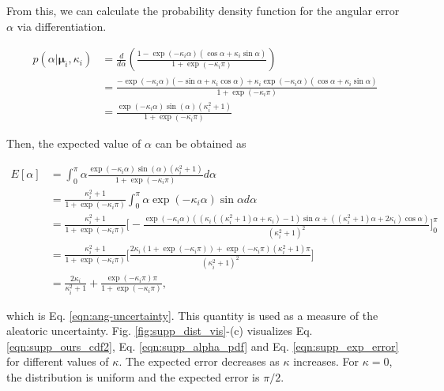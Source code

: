 \documentclass[10pt,twocolumn,letterpaper]{article}
\begin{document}
\noindent
From this, we can calculate the probability density function for the angular error $\alpha$ via differentiation.

\begin{equation}
\begin{aligned}
\label{eqn:supp_alpha_pdf}
p(\alpha|\boldsymbol{\mu}_i,\kappa_i)
&= \frac{d}{d\alpha}
\left(
\frac{1 - \exp(-\kappa_i \alpha) (\cos \alpha + \kappa_i \sin \alpha)}{1 + \exp(-\kappa_i \pi)}
\right) \\
&= 
\frac{- \exp(-\kappa_i \alpha) (-\sin \alpha + \kappa_i \cos \alpha)
+ \kappa_i \exp(-\kappa_i \alpha) (\cos \alpha + \kappa_i \sin \alpha)}
{1 + \exp(-\kappa_i \pi)} \\
&=
\frac{\exp(-\kappa_i \alpha) 
\sin (\alpha)
(\kappa_i^2 + 1)}
{1 + \exp(-\kappa_i \pi)}
\end{aligned}
\end{equation}

\noindent
Then, the expected value of $\alpha$ can be obtained as

\begin{equation}
\begin{aligned}
\label{eqn:supp_exp_error}
E[\alpha]
&=
\int^\pi_0
\alpha
\frac{\exp(-\kappa_i \alpha) 
\sin (\alpha)
(\kappa_i^2 + 1)}
{1 + \exp(-\kappa_i \pi)}
d\alpha \\
&= 
\frac{\kappa_i^2 + 1}{1 + \exp(-\kappa_i \pi)}
\int^\pi_0
\alpha
\exp(-\kappa_i \alpha)
\sin \alpha d\alpha \\
&= \frac{\kappa_i^2 + 1}{1 + \exp(-\kappa_i \pi)}
\Bigg[ -
\frac{
\exp(-\kappa_i \alpha)
((\kappa_i ((\kappa_i^2 + 1) \alpha + \kappa_i) - 1)
\sin \alpha
+ ((\kappa_i^2 + 1) \alpha + 2 \kappa_i) \cos \alpha)
}{
(\kappa_i^2 + 1)^2
}
\Bigg]^\pi_0 \\
&= \frac{\kappa_i^2 + 1}{1 + \exp(-\kappa_i \pi)}
\Bigg[
\frac{
2\kappa_i (1 + \exp(-\kappa_i \pi)) + \exp(-\kappa_i \pi)(\kappa_i^2+1)\pi
}
{(\kappa_i^2 + 1)^2}
\Bigg] \\
&=
\frac{2\kappa_i}{\kappa_i^2+1}
+ \frac{\exp(-\kappa_i \pi)\pi}{1 + \exp(-\kappa_i \pi)},
\end{aligned}
\end{equation}

\noindent
which is Eq. \ref{eqn:ang-uncertainty}. This quantity is used as a measure of the aleatoric uncertainty. Fig. \ref{fig:supp_dist_vis}-(c) visualizes Eq. \ref{eqn:supp_ours_cdf2}, Eq. \ref{eqn:supp_alpha_pdf} and Eq. \ref{eqn:supp_exp_error} for different values of $\kappa$. The expected error decreases as $\kappa$ increases. For $\kappa=0$, the distribution is uniform and the expected error is $\pi/2$.
\end{document}
